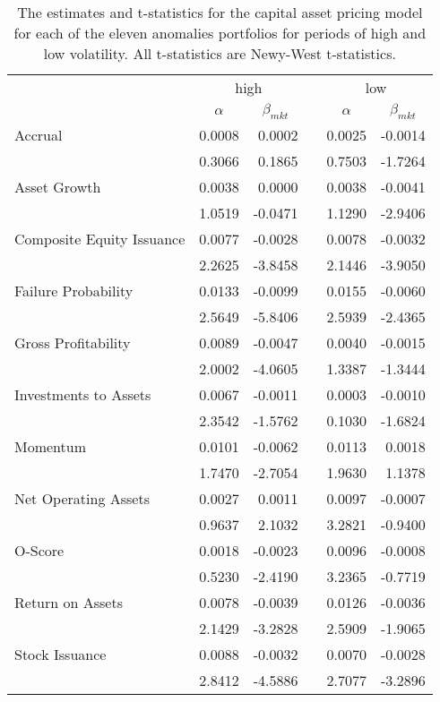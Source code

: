 \begin{table}[htbp]
    \caption{\newline The estimates and t-statistics for the capital asset pricing model for each of the eleven anomalies portfolios for periods of high and low volatility.  All t-statistics are Newy-West t-statistics.}
      \begin{tabular}{lrrrrr}
      \toprule
            & \multicolumn{2}{c}{high} &       & \multicolumn{2}{c}{low} \\
  \cmidrule{2-3}\cmidrule{5-6}          & \multicolumn{1}{c}{$\alpha$} & \multicolumn{1}{c}{$\beta_{mkt}$} &       & \multicolumn{1}{c}{$\alpha$} & \multicolumn{1}{c}{$\beta_{mkt}$} \\
      \midrule
      Accrual & 0.0008 & 0.0002 &       & 0.0025 & -0.0014 \\
            & 0.3066 & 0.1865 &       & 0.7503 & -1.7264 \\
      Asset Growth & 0.0038 & 0.0000 &       & 0.0038 & -0.0041 \\
            & 1.0519 & -0.0471 &       & 1.1290 & -2.9406 \\
      Composite Equity Issuance & 0.0077 & -0.0028 &       & 0.0078 & -0.0032 \\
            & 2.2625 & -3.8458 &       & 2.1446 & -3.9050 \\
      Failure Probability & 0.0133 & -0.0099 &       & 0.0155 & -0.0060 \\
            & 2.5649 & -5.8406 &       & 2.5939 & -2.4365 \\
      Gross Profitability & 0.0089 & -0.0047 &       & 0.0040 & -0.0015 \\
            & 2.0002 & -4.0605 &       & 1.3387 & -1.3444 \\
      Investments to Assets & 0.0067 & -0.0011 &       & 0.0003 & -0.0010 \\
            & 2.3542 & -1.5762 &       & 0.1030 & -1.6824 \\
      Momentum & 0.0101 & -0.0062 &       & 0.0113 & 0.0018 \\
            & 1.7470 & -2.7054 &       & 1.9630 & 1.1378 \\
      Net Operating Assets & 0.0027 & 0.0011 &       & 0.0097 & -0.0007 \\
            & 0.9637 & 2.1032 &       & 3.2821 & -0.9400 \\
      O-Score & 0.0018 & -0.0023 &       & 0.0096 & -0.0008 \\
            & 0.5230 & -2.4190 &       & 3.2365 & -0.7719 \\
      Return on Assets & 0.0078 & -0.0039 &       & 0.0126 & -0.0036 \\
            & 2.1429 & -3.2828 &       & 2.5909 & -1.9065 \\
      Stock Issuance & 0.0088 & -0.0032 &       & 0.0070 & -0.0028 \\
            & 2.8412 & -4.5886 &       & 2.7077 & -3.2896 \\
      \bottomrule
      \end{tabular}%
    \label{tab:epu-capm}%
  \end{table}%

